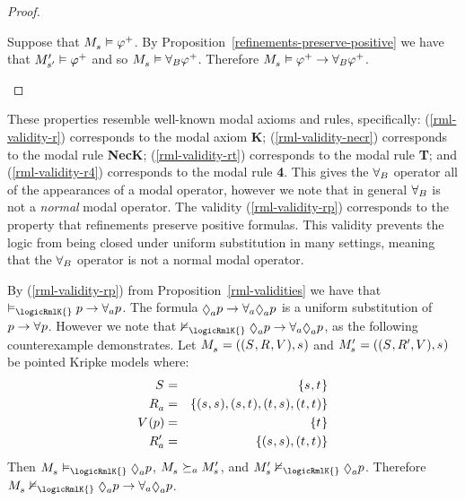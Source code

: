 \begin{proof}
\begin{description}
        Suppose that $\kPModel{\kStateS} \entails \phi^+$.
        By Proposition~\ref{refinements-preserve-positive} we have that ${M^{\prime}_{{s}^{\prime}}} \vDash \varphi^+$ and so $\kPModel{\kStateS} \entails \allrefsBs \phi^+$.
        Therefore $\kPModel{\kStateS} \entails \phi^+ \implies \allrefsBs \phi^+$.
\end{description}
\end{proof}

These properties resemble well-known modal axioms and rules, specifically:
(\ref{rml-validity-r}) corresponds to the modal axiom {\bf K};
(\ref{rml-validity-necr}) corresponds to the modal rule {\bf NecK};
(\ref{rml-validity-rt}) corresponds to the modal rule {\bf T}; and
(\ref{rml-validity-r4}) corresponds to the modal rule {\bf 4}.
This gives the ${\forall_{B}}$ operator all of the appearances of a modal operator, however we note that in general ${\forall_{B}}$ is not a {\em normal} modal operator.
The validity (\ref{rml-validity-rp}) corresponds to the property that refinements preserve positive formulas.
This validity prevents the logic from being closed under uniform substitution in many settings, meaning that the ${\forall_{B}}$ operator is not a normal modal operator.

\begin{example}\label{example-uniform-substitution}
By (\ref{rml-validity-rp}) from Proposition~\ref{rml-validities} we have that $\entails_\logicRmlK{} \atomP \implies \allrefsA \atomP$.
The formula $\possibleA \atomP \implies \allrefsA \possibleA \atomP$ is a uniform substitution of $\atomP \implies \allrefs \atomP$.
However we note that $\nentails_\logicRmlK{} \possibleA \atomP \implies \allrefsA \possibleA \atomP$, as the following counterexample demonstrates.
Let $\kPModelAndTuple{\kStateS}$ and $\kPModelP{\kStateS} = ((\kStates, \kAccessibilityP{}, \kValuation), \kStateS)$ be pointed Kripke models where:
\begin{eqnarray*}
    \kStates &=& \{\kStateS, \kStateT\}\\
    \kAccessibilityA &=& \{(\kStateS, \kStateS), (\kStateS, \kStateT), (\kStateT, \kStateS), (\kStateT, \kStateT)\}\\
    \kValuation(\atomP) &=& \{\kStateT\}\\
    \kAccessibilityPA &=& \{(\kStateS, \kStateS), (\kStateT, \kStateT)\}
\end{eqnarray*}
Then $\kPModel{\kStateS} \entails_\logicRmlK{} \possibleA \atomP$, $\kPModel{\kStateS} \simulatesA \kPModelP{\kStateS}$, and $\kPModelP{\kStateS} \nentails_\logicRmlK{} \possibleA \atomP$.
Therefore $\kPModel{\kStateS} \nentails_\logicRmlK{} \possibleA \atomP \implies \allrefsA \possibleA \atomP$.
\end{example}

